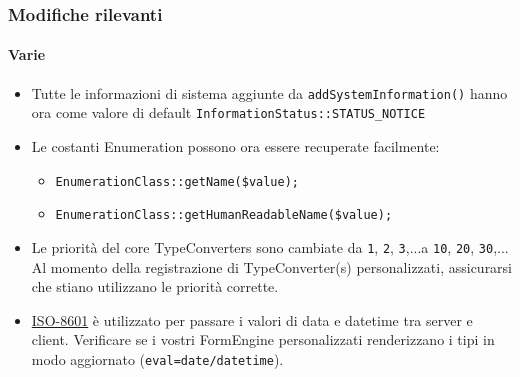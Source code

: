 \begin{frame}[fragile]
	\frametitle{Modifiche rilevanti}
	\framesubtitle{Varie}


	\begin{itemize}
		\item Tutte le informazioni di sistema aggiunte da \texttt{addSystemInformation()} hanno
			ora come valore di default \texttt{InformationStatus::STATUS\_NOTICE}
		\item Le costanti Enumeration possono ora essere recuperate facilmente:

			\begin{itemize}
				\item \texttt{EnumerationClass::getName(\$value);}
				\item \texttt{EnumerationClass::getHumanReadableName(\$value);}
			\end{itemize}

		\item Le priorità del core TypeConverters sono cambiate da 
			\texttt{1}, \texttt{2}, \texttt{3},...\newline a \texttt{10}, \texttt{20}, \texttt{30},...
			Al momento della registrazione di TypeConverter(s) personalizzati, assicurarsi che stiano utilizzano le priorità corrette.

		\item \href{https://en.wikipedia.org/wiki/ISO_8601}{ISO-8601} è utilizzato per passare i valori di data e datetime tra server
			e client. Verificare se i vostri FormEngine personalizzati renderizzano i tipi in modo aggiornato (\texttt{eval=date/datetime}).

	\end{itemize}

\end{frame}












